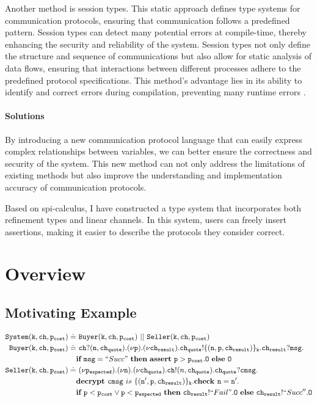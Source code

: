 \documentclass[master,english]{kuisthesis}
\theoremstyle{definition}
\begin{document}
Another method is session types. This static approach defines type systems for communication protocols, ensuring that communication follows a predefined pattern. Session types can detect many potential errors at compile-time, thereby enhancing the security and reliability of the system. Session types not only define the structure and sequence of communications but also allow for static analysis of data flows, ensuring that interactions between different processes adhere to the predefined protocol specifications. This method's advantage lies in its ability to identify and correct errors during compilation, preventing many runtime errors \cite{?}.





\paragraph{Solutions}

By introducing a new communication protocol language that can easily express complex relationships between variables, we can better ensure the correctness and security of the system. This new method can not only address the limitations of existing methods but also improve the understanding and implementation accuracy of communication protocols.

Based on spi-calculus, I have constructed a type system that incorporates both refinement types and linear channels. In this system, users can freely insert assertions, making it easier to describe the protocols they consider correct.





\section{Overview}\label{sec-structure}
\subsection{Motivating Example}
\begin{align*}
    \Code{System(k,ch, \costprice)} \doteq&\  \Code{Buyer(k,ch,\costprice)} \  || \  \Code{Seller(k,ch, \costprice)}
    \\\Code{Buyer(k,ch, \costprice)} \doteq&\  \Code{ch}?(\nonce, \chq).\newP{\price}.\newP{\chr}.\chq!\{(\nonce, \price, \chr)\}_\Code{k}.\chr?\Code{msg}.
    \\&\iteP{\Code{msg} = \success}{\assertP{\price > \costprice}.\zero}{\zero}
    \\\Code{Seller(k,ch, \costprice)} \doteq&\ \newP{\exprice}.\newP{\nonce}.\newP{\chq}.\Code{ch}!(n, \chq).\chq?\Code{cmsg}.
    \\&\decryptP{\Code{cmsg}}{(\Code{n'}, \price, \chr)}{\Code{k}}.\checkP{\Code{n} = \Code{n'}}.
    \\&\iteP{\price < \costprice \lor \price < \exprice}{\chr!\fail.\zero}{\chr!``Succ''.\mathtt{O}}
\end{align*}
\end{document}
